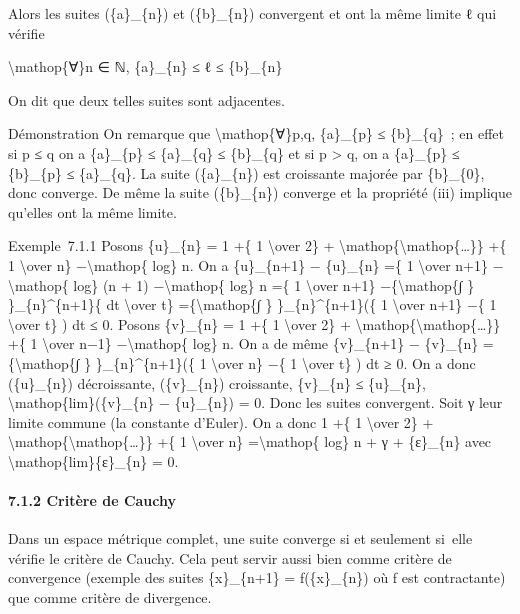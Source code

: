 \documentclass[]{article}
\begin{document}
Alors les suites (\{a\}\_\{n\}) et (\{b\}\_\{n\}) convergent et ont la
même limite ℓ qui vérifie

\textbackslash{}mathop\{∀\}n ∈ ℕ, \{a\}\_\{n\} ≤ ℓ ≤ \{b\}\_\{n\}

On dit que deux telles suites sont adjacentes.

Démonstration On remarque que \textbackslash{}mathop\{∀\}p,q,
\{a\}\_\{p\} ≤ \{b\}\_\{q\}~; en effet si p ≤ q on a \{a\}\_\{p\} ≤
\{a\}\_\{q\} ≤ \{b\}\_\{q\} et si p \textgreater{} q, on a \{a\}\_\{p\}
≤ \{b\}\_\{p\} ≤ \{a\}\_\{q\}. La suite (\{a\}\_\{n\}) est croissante
majorée par \{b\}\_\{0\}, donc converge. De même la suite (\{b\}\_\{n\})
converge et la propriété (iii) implique qu'elles ont la même limite.

Exemple~7.1.1 Posons \{u\}\_\{n\} = 1 +\{ 1 \textbackslash{}over 2\} +
\textbackslash{}mathop\{\textbackslash{}mathop\{\ldots{}\}\} +\{ 1
\textbackslash{}over n\} −\textbackslash{}mathop\{ log\} n. On a
\{u\}\_\{n+1\} − \{u\}\_\{n\} =\{ 1 \textbackslash{}over n+1\}
−\textbackslash{}mathop\{ log\} (n + 1) −\textbackslash{}mathop\{ log\}
n =\{ 1 \textbackslash{}over n+1\} −\{\textbackslash{}mathop\{∫ \}
\}\_\{n\}\^{}\{n+1\}\{ dt \textbackslash{}over t\}
=\{\textbackslash{}mathop\{∫ \} \}\_\{n\}\^{}\{n+1\}(\{ 1
\textbackslash{}over n+1\} −\{ 1 \textbackslash{}over t\} ) dt ≤ 0.
Posons \{v\}\_\{n\} = 1 +\{ 1 \textbackslash{}over 2\} +
\textbackslash{}mathop\{\textbackslash{}mathop\{\ldots{}\}\} +\{ 1
\textbackslash{}over n−1\} −\textbackslash{}mathop\{ log\} n. On a de
même \{v\}\_\{n+1\} − \{v\}\_\{n\} =\{\textbackslash{}mathop\{∫ \}
\}\_\{n\}\^{}\{n+1\}(\{ 1 \textbackslash{}over n\} −\{ 1
\textbackslash{}over t\} ) dt ≥ 0. On a donc (\{u\}\_\{n\})
décroissante, (\{v\}\_\{n\}) croissante, \{v\}\_\{n\} ≤ \{u\}\_\{n\},
\textbackslash{}mathop\{lim\}(\{v\}\_\{n\} − \{u\}\_\{n\}) = 0. Donc les
suites convergent. Soit γ leur limite commune (la constante d'Euler). On
a donc 1 +\{ 1 \textbackslash{}over 2\} +
\textbackslash{}mathop\{\textbackslash{}mathop\{\ldots{}\}\} +\{ 1
\textbackslash{}over n\} =\textbackslash{}mathop\{ log\} n + γ +
\{ε\}\_\{n\} avec \textbackslash{}mathop\{lim\}\{ε\}\_\{n\} = 0.

\paragraph{7.1.2 Critère de Cauchy}

Dans un espace métrique complet, une suite converge si et seulement
si~elle vérifie le critère de Cauchy. Cela peut servir aussi bien comme
critère de convergence (exemple des suites \{x\}\_\{n+1\} =
f(\{x\}\_\{n\}) où f est contractante) que comme critère de divergence.
\end{document}

